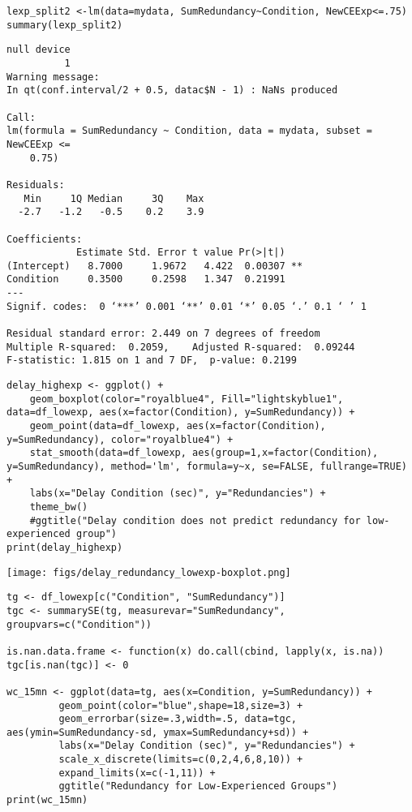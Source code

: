 \documentclass[10pt]{article}
\begin{document}
\begin{verbatim}
lexp_split2 <-lm(data=mydata, SumRedundancy~Condition, NewCEExp<=.75)
summary(lexp_split2)
\end{verbatim}

\begin{verbatim}
null device 
          1 
Warning message:
In qt(conf.interval/2 + 0.5, datac$N - 1) : NaNs produced

Call:
lm(formula = SumRedundancy ~ Condition, data = mydata, subset = NewCEExp <= 
    0.75)

Residuals:
   Min     1Q Median     3Q    Max 
  -2.7   -1.2   -0.5    0.2    3.9 

Coefficients:
            Estimate Std. Error t value Pr(>|t|)   
(Intercept)   8.7000     1.9672   4.422  0.00307 **
Condition     0.3500     0.2598   1.347  0.21991   
---
Signif. codes:  0 ‘***’ 0.001 ‘**’ 0.01 ‘*’ 0.05 ‘.’ 0.1 ‘ ’ 1

Residual standard error: 2.449 on 7 degrees of freedom
Multiple R-squared:  0.2059,	Adjusted R-squared:  0.09244 
F-statistic: 1.815 on 1 and 7 DF,  p-value: 0.2199
\end{verbatim}


\begin{verbatim}
delay_highexp <- ggplot() +
    geom_boxplot(color="royalblue4", Fill="lightskyblue1", data=df_lowexp, aes(x=factor(Condition), y=SumRedundancy)) +
    geom_point(data=df_lowexp, aes(x=factor(Condition), y=SumRedundancy), color="royalblue4") +
    stat_smooth(data=df_lowexp, aes(group=1,x=factor(Condition), y=SumRedundancy), method='lm', formula=y~x, se=FALSE, fullrange=TRUE) +
    labs(x="Delay Condition (sec)", y="Redundancies") +
    theme_bw()
    #ggtitle("Delay condition does not predict redundancy for low-experienced group")
print(delay_highexp)
\end{verbatim}

\texttt{[image: figs/delay\_redundancy\_lowexp-boxplot.png]}


\begin{verbatim}
tg <- df_lowexp[c("Condition", "SumRedundancy")]
tgc <- summarySE(tg, measurevar="SumRedundancy", groupvars=c("Condition"))

is.nan.data.frame <- function(x) do.call(cbind, lapply(x, is.na))
tgc[is.nan(tgc)] <- 0

wc_15mn <- ggplot(data=tg, aes(x=Condition, y=SumRedundancy)) +
	     geom_point(color="blue",shape=18,size=3) +
	     geom_errorbar(size=.3,width=.5, data=tgc, aes(ymin=SumRedundancy-sd, ymax=SumRedundancy+sd)) +
	     labs(x="Delay Condition (sec)", y="Redundancies") +
	     scale_x_discrete(limits=c(0,2,4,6,8,10)) +
	     expand_limits(x=c(-1,11)) +
	     ggtitle("Redundancy for Low-Experienced Groups")
print(wc_15mn)
\end{verbatim}
\end{document}
